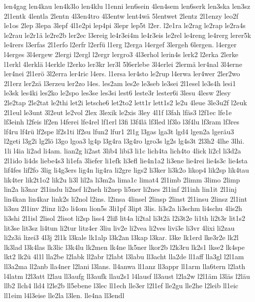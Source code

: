 {len4gag
len4kau
len4k3lo
len4klu
l1enni
len6sein
4len4sem
len6serk
len3ska
len3sz
2l1entk
4lentla
2lentn
4l3en4tro
4l3entw
lent4wä
5lentwet
2lentz
2l1enzy
leo2f
le1os
2lep
3lepa
3lepf
4l1e2pi
lep4pi
3lepr
lep5t
l2er.
l2e1ra
le2rag
le2rap
le2ra4s
le2rau
le2r1ä
le2re2b
ler2ec
l3ereig
le4r3ei4m
le4r3eis
le2rel
le4reng
le4rerg
lerer5k
le4rers
l3erfas
2l1erfo
l2erfr
l2erfü
l1erg
l2erga
l4ergef
3lergeh
6lergen.
l4erger
l4erges
3l4ergew
2lergi
l2ergl
l2ergr
lergro3
4l3erhol
lerin4s
lerk2
l2erka
2lerke
l1erkl
4lerklä
l4erkle
l2erko
ler3kr
ler3l
5l6erlebe
3l4erlei
2lermä
ler4nal
3l4erne
ler4nei
2l1erö
3l2erra
ler4ric
l4ers.
l1ersa
ler4sto
le2rup
l4erwa
ler4wer
2ler2wo
2l1erz
ler2zä
l3erzeu
ler2zo
l4es.
les2am
les2e
le3seb
le3sei
2l1esel
le3s4h
lesi1
le3sk
les4ki
les2ko
le2spo
les3se
les3si
lest6
leste3r
lester6i
3lesu
4lesw
2lesy
2le2tap
2le2tat
le2thi
let2i
letsche6
let2to2
lett1r
lett1s2
le2u
4leue
3le3u2f
l2euk
2l1eul
le3unt
3l2eut
le2vol
2lex
3lexik
le2xis
3ley
4l1f
l3fah
lfäs3
l2f1ec
lfe1e
lf3einh
l2feis
lf2en
l4ferei
lfe4rel
lf1erl
l3fi
l3f4lä
lf3led
lf3lo
l3f4lu
lf3ram
lf3res
lf4ru
lf4rü
lf2spe
lf2s1ti
lf2su
lfun2
lfur1
2l1g
l3gas
lga3t
lgd4
lgen2a
lgeräu3
l2geti
l3g2i
lg2lö
l3go
lgoa3
lg4p
l3g4ra
l3g4ro
lgro3s
lg2s
lg4s3t
2l3h2
4lhe
3lhi.
1li
l4ia
li2ad
li4am.
lian2g
li2ast
3lib4
libi3
li1c
lich4ta
lich4to
4lick
li2cl
li3d2a
2l1ido
li4ds
liebe4s3
li1efa
3liefer
li1efk
li3efl
lie4n1a2
li3ene
lie4rei
lie4s3c
lie4sta
lif4fes
lif2fo
3lig
li4g3ers
lig4n
lig4ra
li2gre
ligs2
li3ker
li3k2o
likop4
lik2sp
lik4tau
lik4ter
lik2t1o2
lik2u
li3l
lil2a
li3m2a
lima1c
limat4
2l1imb
2limm
3limo
2limp
lin2a
li3nar
2l1indu
li2nef
li2neh
li2nep
li5ner
li2nes
2l1inf
2l1inh
lin1it
2l1inj
lin4kan
lin4kar
link2s
li2nol
l2ins.
l2insa
4linsel
2linsp
2linst
2l1insu
2linsz
2l1int
li3nu
2l1inv
2linz
li2o
li4om
lion5s
3li1pf
3lipt
3lis.
li3s2a
li3schm
li4schu
4lis2h
li3shi
2l1isl
2lisol
2lisot
li2sp
liss4
2liß
lit4a
li2tal
li3t2ä
l2i3t2e
li1th
li2t3r
lit1s2
lit3se
lit3sz
li4tun
li2tur
litz4er
3liu
liv2e
li2vea
li2ves
livi3e
li3vr
4lixi
li2zau
li2z3ä
lizei3
4l3j
2l1k
l3kale
lk1alp
l3k2an
l3kap
l3kar.
l3ke
lk1erd
lke3r2e
lk2l
lk3lad
l3k4las
lk3lic
l3k4lu
lk2men
lk4ne
lk5ner
lkor2b
l2k3ru
lk2s1
lkse2
lk4spe
lkt2
lk2ü
4l1l
lla2be
l2labk
ll2abr
l2labt
l3labu
ll3acht
lla2de
ll1aff
lla3gl
l2l1am
ll3a2ma
ll2anb
lla4ner
l2lani
l3lans.
ll4anwa
ll1anz
ll3appr
ll1arm
lla6tern
l2lath
l4latm
l2l3att
l2lau
ll3aufg
ll3aufk
llau2s1
l4lausf
ll3aust
l2la2w
l2l1äm
l3läs
l2läu
llb2
llch4
lld4
l2le2b
ll5ebene
l3lec
ll1ech
lle3er
l2l1ef
lle2gu
lle2he
l2leib
ll1eic
ll1eim
l4l3eise
lle2la
l3len.
lle4na
ll3endl
}
